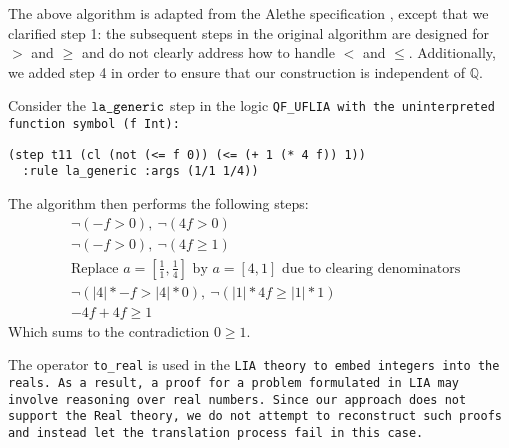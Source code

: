 The above algorithm is adapted from the Alethe specification \cite{alethespec}, except that we clarified step 1: the subsequent steps in the original algorithm are designed for $>$ and $\geq$ and do not clearly address how to handle $<$ and $\leq$.
Additionally, we added step 4 in order to ensure that our construction is independent of $\mathbb{Q}$.

\begin{example}
Consider the $\tt{la\_generic}$ step in the logic \tt{QF\_UFLIA} with the uninterpreted function symbol \lstinline[language=SMT,basicstyle=\ttfamily\upshape]|(f Int)|:
\begin{lstlisting}[language=SMT,label={lst:lageneric-example}]
(step t11 (cl (not (<= f 0)) (<= (+ 1 (* 4 f)) 1))
  :rule la_generic :args (1/1 1/4))
\end{lstlisting} 
%
The algorithm then performs the following steps:
\begin{align}
&\neg (- f > 0),~ \neg(4f > 0) \label{eq:step2}\tag{Step 2}\\
&\neg (- f > 0),~ \neg(4f \geq 1) \label{eq:step3}\tag{Step 3}\\
&\text{Replace } a = [\frac{1}{1}, \frac{1}{4}] \text{ by } a = [4, 1] \text{ due to clearing denominators} \label{eq:step4}\tag{Step 4}\\
&\neg (|4| * - f > |4| * 0 ), ~ \neg(|1| * 4f \geq |1| * 1) \label{eq:step5}\tag{Step 5} \\
&-4f + 4f \geq 1 \label{eq:step6}\tag{Step 6}
\end{align}
Which sums to the contradiction  $0 \geq 1$.
\label{ex:la_generic_example_red}
\end{example}

\begin{remark}
The operator \lstinline[language=SMT,basicstyle=\ttfamily\footnotesize]{to_real} is used in the \tt{LIA} theory to embed integers into the reals.
As a result, a proof for a problem formulated in \tt{LIA} may involve reasoning over real numbers.
Since our approach does not support the \lstinline[language=SMT,basicstyle=\ttfamily\footnotesize\upshape]{Real} theory, we do not attempt to reconstruct such proofs and instead let the translation process fail in this case.
\end{remark}